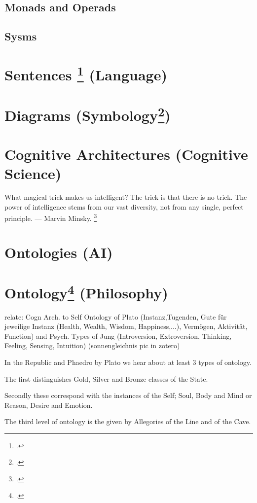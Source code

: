 \documentclass[12pt,a4paper]{article}
\begin{document}
\subsection{Monads and Operads}

\subsection{Sysms}


\section{Sentences \footcite{Carnie2012} (Language)}

\section{Diagrams (Symbology\footcite{Jung1964})} 

\section{Cognitive Architectures (Cognitive Science)}
What magical trick makes us intelligent? The trick is that there is no trick. The power of intelligence stems from our vast diversity, not from any single, perfect principle. — Marvin Minsky. \footcite[308]{Minsky1988}

\section{Ontologies (AI)}

\section{Ontology\footcite{Platon2010} (Philosophy)}
relate: Cogn Arch. to Self Ontology of Plato (Instanz,Tugenden, Gute für jeweilige Instanz (Health, Wealth, Wisdom, Happiness,...), Vermögen, Aktivität, Function) and Psych. Types of Jung (Introversion, Extroversion, Thinking, Feeling, Sensing, Intuition) (sonnengleichnis pic in zotero)

In the Republic and Phaedro by Plato we hear about at least 3 types of ontology. 

The first distinguishes Gold, Silver and Bronze classes of the State.

Secondly these correspond with the instances of the Self; Soul, Body and Mind or Reason, Desire and Emotion.

The third level of ontology is the given by Allegories of the Line and of the Cave.
\end{document}
